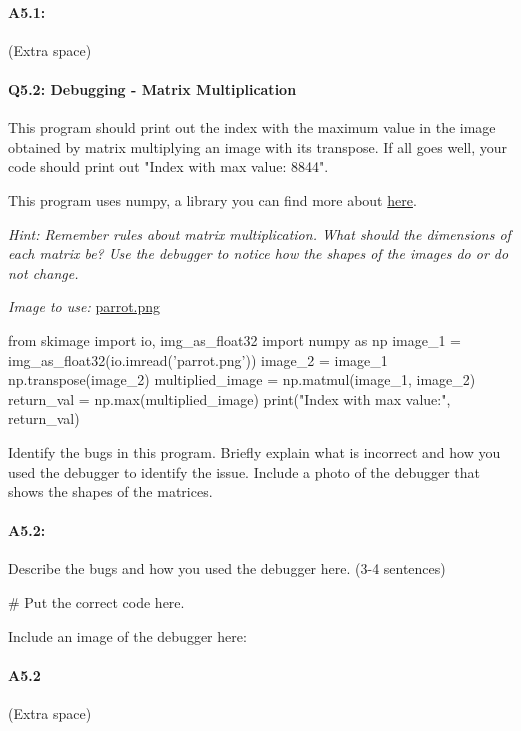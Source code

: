 \documentclass[11pt]{article}
\begin{document}
\pagebreak
\paragraph{A5.1:}
(Extra space)

\pagebreak
\paragraph{Q5.2: Debugging - Matrix Multiplication} This program should print out the index with the maximum value in the image obtained by matrix multiplying an image with its transpose. If all goes well, your code should print out "Index with max value: 8844".

This program uses numpy, a library you can find more about \href{https://numpy.org/doc/stable/}{here}.

\emph{Hint: Remember rules about matrix multiplication. What should the dimensions of each matrix be? Use the debugger to notice how the shapes of the images do or do not change.}

\emph{Image to use:} \href{parrot.png}{parrot.png}

\begin{python}
from skimage import io, img_as_float32
import numpy as np
image_1 = img_as_float32(io.imread('parrot.png'))
image_2 = image_1
np.transpose(image_2)
multiplied_image = np.matmul(image_1, image_2)
return_val = np.max(multiplied_image)
print("Index with max value:", return_val)
\end{python}
Identify the bugs in this program. Briefly explain what is incorrect and how you used the debugger to identify the issue. Include a photo of the debugger that shows the shapes of the matrices.


\paragraph{A5.2: } Describe the bugs and how you used the debugger here. (3-4 sentences)
\begin{python}
# Put the correct code here.
\end{python}

Include an image of the debugger here:

\pagebreak
\paragraph{A5.2} (Extra space)
\end{document}
